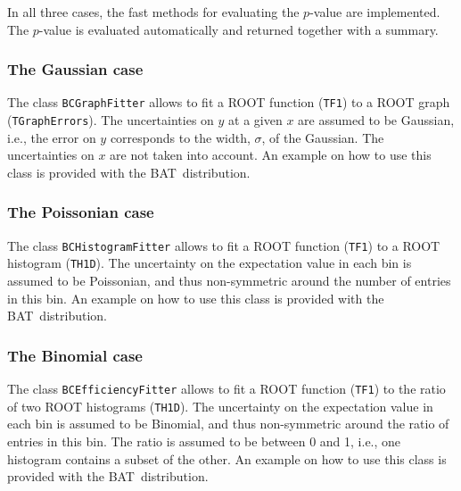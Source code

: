 \documentclass[11pt, a4paper]{article}
\newcommand{\BAT}{{\sc BAT}}
\begin{document}
\noindent 
In all three cases, the fast methods for evaluating the $p$-value are
implemented. The $p$-value is evaluated automatically and returned
together with a summary.


\subsubsection{The Gaussian case} 

The class \verb|BCGraphFitter| allows to fit a ROOT function
(\verb|TF1|) to a ROOT graph (\verb|TGraphErrors|). The uncertainties
on $y$ at a given $x$ are assumed to be Gaussian, i.e., the error on
$y$ corresponds to the width, $\sigma$, of the Gaussian. The
uncertainties on $x$ are not taken into account. An example on how to
use this class is provided with the \BAT\ distribution.


\subsubsection{The Poissonian case} 

The class \verb|BCHistogramFitter| allows to fit a ROOT function
(\verb|TF1|) to a ROOT histogram (\verb|TH1D|). The uncertainty on the
expectation value in each bin is assumed to be Poissonian, and thus
non-symmetric around the number of entries in this bin. An example on
how to use this class is provided with the \BAT\ distribution.


\subsubsection{The Binomial case} 

The class \verb|BCEfficiencyFitter| allows to fit a ROOT function
(\verb|TF1|) to the ratio of two ROOT histograms (\verb|TH1D|). The
uncertainty on the expectation value in each bin is assumed to be
Binomial, and thus non-symmetric around the ratio of entries in this
bin. The ratio is assumed to be between 0 and 1, i.e., one histogram
contains a subset of the other. An example on how to use this class is
provided with the \BAT\ distribution.


\end{document}
